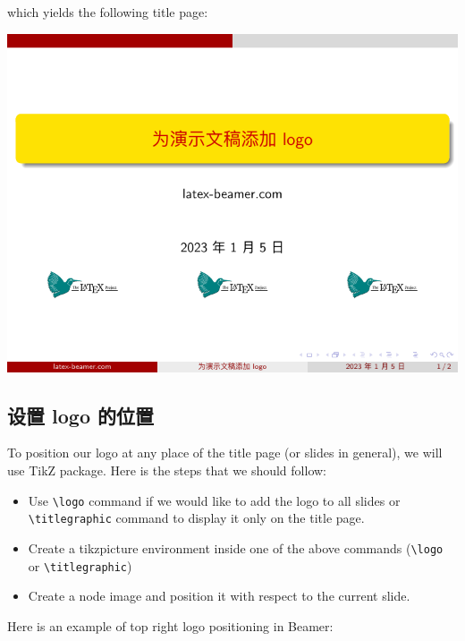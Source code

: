 \inputminted[linenos=true]{latex}{examples/beamer/logo-multiple.tex}

which yields the following title page:

\includegraphics[page=1]{examples/beamer/logo-multiple.pdf}

\subsection{设置 logo 的位置}

To position our logo at any place of the title page (or slides in general), we will use TikZ package. Here is the steps that we should follow:

\begin{itemize}
  \item Use \verb|\logo| command if we would like to add the logo to all slides or \verb|\titlegraphic| command to display it only on the title page.
  \item Create a tikzpicture environment inside one of the above commands (\verb|\logo| or \verb|\titlegraphic|)
  \item Create a node image and position it with respect to the current slide.
\end{itemize}
  
Here is an example of top right logo positioning in Beamer:

\inputminted[linenos=true]{latex}{examples/beamer/logo-position1.tex}

